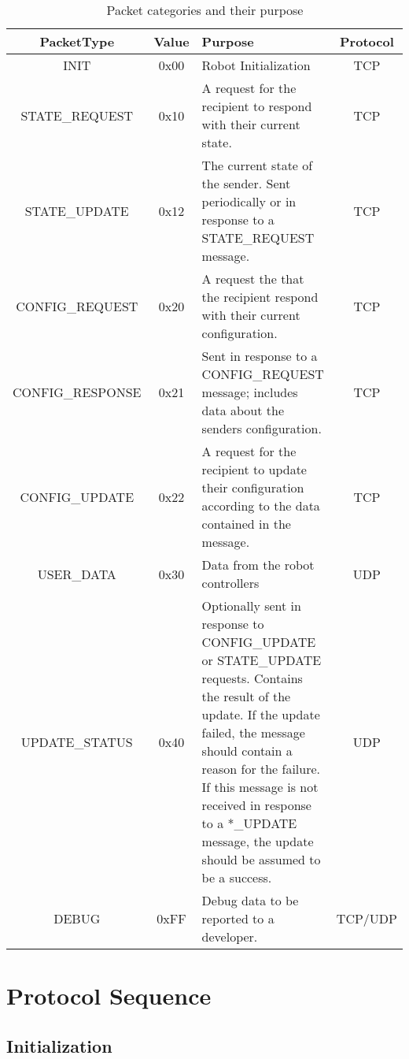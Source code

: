 \documentclass[11pt]{article}
\begin{document}
\begin{table}[h]
    \centering
    \caption{Packet categories and their purpose}
    \label{tab:pktTypes}
    \begin{tabular}{|c|c|p{3in}|c|}
        \hline
        PacketType & Value & Purpose & Protocol \\ 
        \hline
        INIT & 0x00 & Robot Initialization & TCP \\ 
        \hline
        STATE\_REQUEST & 0x10 & A request for the recipient to respond with their current state. & TCP \\
        \hline
        STATE\_UPDATE & 0x12 & The current state of the sender. 
        Sent periodically or in response to a STATE\_REQUEST message. & TCP \\
        \hline
        CONFIG\_REQUEST & 0x20 & A request the that the recipient respond with their current configuration. & TCP \\
        \hline
        CONFIG\_RESPONSE & 0x21 & Sent in response to a CONFIG\_REQUEST message; 
            includes data about the senders configuration. & TCP \\
        \hline
        CONFIG\_UPDATE & 0x22 & A request for the recipient to update their configuration according to the data contained 
            in the message. & TCP \\
        \hline
        USER\_DATA & 0x30 & Data from the robot controllers & UDP \\
        \hline
        UPDATE\_STATUS & 0x40 & Optionally sent in response to CONFIG\_UPDATE or STATE\_UPDATE requests.
        Contains the result of the update.
        If the update failed, the message should contain a reason for the failure.
        If this message is not received in response to a *\_UPDATE message, the update should be assumed to be a success.& UDP \\
        \hline
        DEBUG & 0xFF & Debug data to be reported to a developer. & TCP/UDP \\
        \hline
    \end{tabular}
\end{table}

\section {Protocol Sequence}
\subsection{Initialization}
\end{document}
